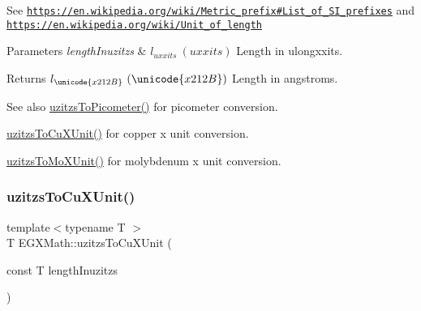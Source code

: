 See \href{https://en.wikipedia.org/wiki/Metric_prefix#List_of_SI_prefixes}{\tt https\+://en.\+wikipedia.\+org/wiki/\+Metric\+\_\+prefix\#\+List\+\_\+of\+\_\+\+S\+I\+\_\+prefixes} and \href{https://en.wikipedia.org/wiki/Unit_of_length}{\tt https\+://en.\+wikipedia.\+org/wiki/\+Unit\+\_\+of\+\_\+length} 
\begin{DoxyParams}{Parameters}
{\em length\+Inuzitzs} & $ l_{uxxits}\ (uxxits)$ Length in ulongxxits. \\
\hline
\end{DoxyParams}
\begin{DoxyReturn}{Returns}
$ l_{\unicode{x212B}}\ (\unicode{x212B})$ Length in angstroms. 
\end{DoxyReturn}
\begin{DoxySeeAlso}{See also}
\mbox{\hyperlink{group___e_g_x_math-_conversions-_length_conversions-_non-_s_i-uzitzs-_s_i_ga48c60a4876ac426d1717096263648a4d}{uzitzs\+To\+Picometer()}} for picometer conversion. 

\mbox{\hyperlink{group___e_g_x_math-_conversions-_length_conversions-_non-_s_i-uzitzs-_non-_s_i_gab25470e41b88c41d4bf32622baa6c472}{uzitzs\+To\+Cu\+X\+Unit()}} for copper x unit conversion. 

\mbox{\hyperlink{group___e_g_x_math-_conversions-_length_conversions-_non-_s_i-uzitzs-_non-_s_i_ga64b556911b0bb06cf315aa02f5e2d379}{uzitzs\+To\+Mo\+X\+Unit()}} for molybdenum x unit conversion. 
\end{DoxySeeAlso}
\mbox{\label{group___e_g_x_math-_conversions-_length_conversions-_non-_s_i-uzitzs-_non-_s_i_gab25470e41b88c41d4bf32622baa6c472}} 
\subsubsection{\texorpdfstring{uzitzs\+To\+Cu\+X\+Unit()}{uzitzsToCuXUnit()}}
{\footnotesize\ttfamily template$<$typename T $>$ \\
T E\+G\+X\+Math\+::uzitzs\+To\+Cu\+X\+Unit (\begin{DoxyParamCaption}\item[{const T}]{length\+Inuzitzs }\end{DoxyParamCaption})}



